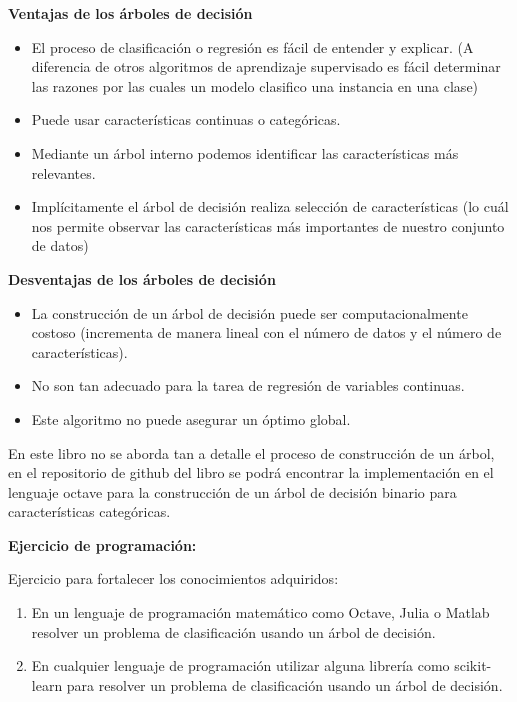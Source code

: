 \documentclass[11pt,fleqn]{book} %
\begin{document}
\textbf{Ventajas de los árboles de decisión}

\begin{itemize}
\item El proceso de clasificación o regresión es fácil de entender y explicar. (A diferencia de otros algoritmos de aprendizaje supervisado es fácil determinar las razones por las cuales un modelo clasifico una instancia en una clase)
\item Puede usar características continuas o categóricas.
\item Mediante un árbol interno podemos identificar las características más relevantes. 
\item Implícitamente el árbol de decisión realiza selección de características (lo cuál nos permite observar las características más importantes de nuestro conjunto de datos)
\end{itemize}

\textbf{Desventajas de los árboles de decisión}

\begin{itemize}
\item La construcción de un árbol de decisión puede ser computacionalmente costoso (incrementa de manera lineal con el número de datos y el número de características).
\item No son tan adecuado para la tarea de regresión de variables continuas.
\item Este algoritmo no puede asegurar un óptimo global.
\end{itemize}

En este libro no se aborda tan a detalle el proceso de construcción de un árbol, en el repositorio de github del libro se podrá encontrar la implementación en el lenguaje octave para la construcción de un árbol de decisión binario para características categóricas.

\clearpage

\textbf{Ejercicio de programación:}

Ejercicio para fortalecer los conocimientos adquiridos:

\begin{enumerate}
\item En un lenguaje de programación matemático como Octave, Julia o Matlab resolver un problema de clasificación usando un árbol de decisión.
\item En cualquier lenguaje de programación utilizar alguna librería como scikit-learn para resolver un problema de clasificación usando un árbol de decisión.
\end{enumerate}
\end{document}
